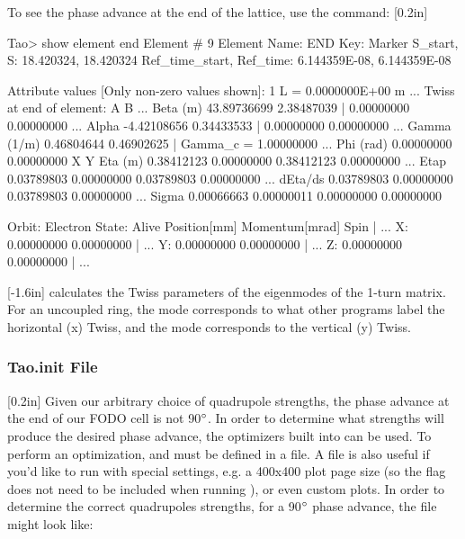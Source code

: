 \documentclass{hitec}     %
\begin{document}
To see the phase advance at the end of the lattice, use the command:
%
[0.2in]
%
\begin{code}
Tao> show element end
Element # 9
Element Name: END
Key: Marker
S_start, S:     18.420324,     18.420324
Ref_time_start, Ref_time:  6.144359E-08,  6.144359E-08

Attribute values [Only non-zero values shown]:
    1  L                           =  0.0000000E+00 m
                            ...
Twiss at end of element:
                          A              B       ...
  Beta (m)        43.89736699     2.38487039  |   0.00000000   0.00000000  ...
  Alpha           -4.42108656     0.34433533  |   0.00000000   0.00000000  ...
  Gamma (1/m)      0.46804644     0.46902625  |   Gamma_c =   1.00000000   ...
  Phi (rad)        0.00000000     0.00000000            X              Y    
  Eta (m)          0.38412123     0.00000000     0.38412123     0.00000000 ...
  Etap             0.03789803     0.00000000     0.03789803     0.00000000 ...
  dEta/ds          0.03789803     0.00000000     0.03789803     0.00000000 ...
  Sigma            0.00066663     0.00000011     0.00000000     0.00000000

Orbit:  Electron   State: Alive
         Position[mm] Momentum[mrad]        Spin   | ...
  X:       0.00000000     0.00000000               | ...
  Y:       0.00000000     0.00000000               | ...
  Z:       0.00000000     0.00000000               | ...
\end{code} 
%
[-1.6in]
%
\tao calculates the Twiss parameters of the eigenmodes of the 1-turn matrix. For an uncoupled ring, the  mode corresponds to what other programs label the horizontal (x) Twiss, and the  mode corresponds to the vertical (y) Twiss.

\subsubsection{Tao.init File}

[0.2in]
%
Given our arbitrary choice of quadrupole strengths, the phase advance at the end of our FODO cell is not 90$\degree$. In order to determine what strengths will produce the desired phase advance, the optimizers built into \tao can be used. To perform an optimization,  and  must be defined in a  file. A  file is also useful if you'd like \tao to run with special settings, e.g. a 400x400 plot page size (so the  flag does not need to be included when running \tao), or even custom plots. In order to determine the correct quadrupoles strengths, for a 90$\degree$ phase advance, the  file might look like:
\end{document}
